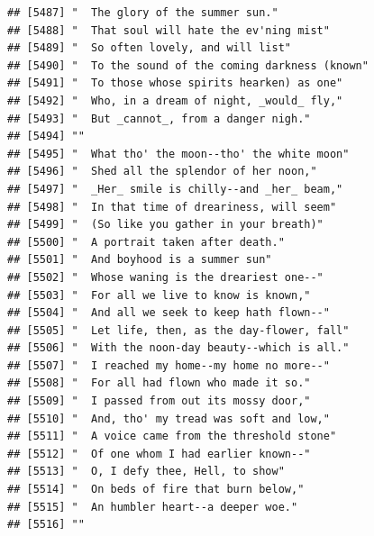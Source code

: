\documentclass{article}\usepackage[]{graphicx}\usepackage[]{color}
\makeatletter
\newenvironment{kframe}{%
 \def\at@end@of@kframe{}%
 \ifinner\ifhmode%
  \def\at@end@of@kframe{\end{minipage}}%
  \begin{minipage}{\columnwidth}%
 \fi\fi%
 \def\FrameCommand##1{\hskip\@totalleftmargin \hskip-\fboxsep
 \colorbox{shadecolor}{##1}\hskip-\fboxsep
     \hskip-\linewidth \hskip-\@totalleftmargin \hskip\columnwidth}%
 \MakeFramed {\advance\hsize-\width
   \@totalleftmargin\z@ \linewidth\hsize
   \@setminipage}}%
 {\par\unskip\endMakeFramed%
 \at@end@of@kframe}
\newenvironment{knitrout}{}{} %
\makeatother
\begin{document}
\begin{knitrout}
\begin{kframe}
\begin{verbatim}
## [5487] "  The glory of the summer sun."                                              
## [5488] "  That soul will hate the ev'ning mist"                                      
## [5489] "  So often lovely, and will list"                                            
## [5490] "  To the sound of the coming darkness (known"                                
## [5491] "  To those whose spirits hearken) as one"                                    
## [5492] "  Who, in a dream of night, _would_ fly,"                                    
## [5493] "  But _cannot_, from a danger nigh."                                         
## [5494] ""                                                                            
## [5495] "  What tho' the moon--tho' the white moon"                                   
## [5496] "  Shed all the splendor of her noon,"                                        
## [5497] "  _Her_ smile is chilly--and _her_ beam,"                                    
## [5498] "  In that time of dreariness, will seem"                                     
## [5499] "  (So like you gather in your breath)"                                       
## [5500] "  A portrait taken after death."                                             
## [5501] "  And boyhood is a summer sun"                                               
## [5502] "  Whose waning is the dreariest one--"                                       
## [5503] "  For all we live to know is known,"                                         
## [5504] "  And all we seek to keep hath flown--"                                      
## [5505] "  Let life, then, as the day-flower, fall"                                   
## [5506] "  With the noon-day beauty--which is all."                                   
## [5507] "  I reached my home--my home no more--"                                      
## [5508] "  For all had flown who made it so."                                         
## [5509] "  I passed from out its mossy door,"                                         
## [5510] "  And, tho' my tread was soft and low,"                                      
## [5511] "  A voice came from the threshold stone"                                     
## [5512] "  Of one whom I had earlier known--"                                         
## [5513] "  O, I defy thee, Hell, to show"                                             
## [5514] "  On beds of fire that burn below,"                                          
## [5515] "  An humbler heart--a deeper woe."                                           
## [5516] ""                                                                            

\end{verbatim}
\end{kframe}
\end{knitrout}
\end{document}
